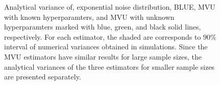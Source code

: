 \documentclass[journal]{IEEEtran}
\begin{document}
\begin{figure}[!t]
	\centering
	\hfil
	\caption{Analytical variance of, exponential noise distribution,  BLUE, MVU with known hyperparamters, and MVU with unknown hyperparamters marked with blue, green, and black solid lines, respectively. For each estimator, the shaded are corresponds to $90\%$ interval of numerical variances obtained in simulations. Since the MVU estimators have similar results for large sample sizes, the analytical variances of the three estimators for smaller sample sizes are presented separately.}
	\label{fig:exponential_blue_mvu}
\end{figure}
%
%
\end{document}
